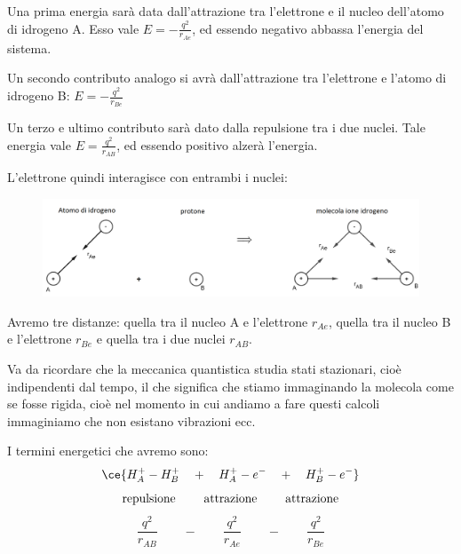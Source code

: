 Una prima energia sarà data dall'attrazione tra l'elettrone e il nucleo dell'atomo di idrogeno A. Esso vale $E=-\frac{q^2}{r_{Ae}}$, ed essendo negativo abbassa l'energia del sistema.

Un secondo contributo analogo si avrà dall'attrazione tra l'elettrone e l'atomo di idrogeno B: $E=-\frac{q^2}{r_{Be}}$

Un terzo e ultimo contributo sarà dato dalla repulsione tra i due nuclei. Tale energia vale $E=\frac{q^2}{r_{AB}}$, ed essendo positivo alzerà l'energia.

\vspace{0.2cm}L'elettrone quindi interagisce con entrambi i nuclei:
\begin{figure}[htp]
    \centering
    \includegraphics[width=14cm]{immagini/interazione_elettrone_con_protoni.png}
\end{figure}

Avremo tre distanze: quella tra il nucleo A e l'elettrone $r_{Ae}$, quella tra il nucleo B e l'elettrone $r_{Be}$ e quella tra i due nuclei $r_{AB}$.

Va da ricordare che la meccanica quantistica studia stati stazionari, cioè indipendenti dal tempo, il che significa che stiamo immaginando la molecola come se fosse rigida, cioè nel momento in cui andiamo a fare questi calcoli immaginiamo che non esistano vibrazioni ecc.

I termini energetici che avremo sono:
$$\ce{H_A^+-H_B^+ \quad + \quad H_A^+-e^- \quad + \quad H_B^+-e^-}$$
$$\text{repulsione \qquad attrazione \qquad attrazione}$$
$$\frac{q^2}{r_{AB}} \qquad - \qquad \frac{q^2}{r_{Ae}} \qquad - \qquad \frac{q^2}{r_{Be}}$$

